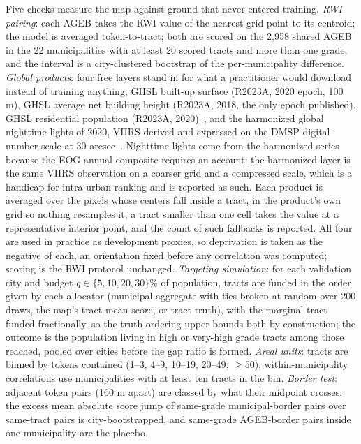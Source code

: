 \documentclass[11pt]{article}
\begin{document}
Five checks measure the map against ground that never entered training. \emph{RWI
pairing}: each AGEB takes the RWI value of the nearest grid point to its centroid; the
model is averaged token-to-tract; both are scored on the 2{,}958 shared AGEB in the 22
municipalities with at least 20 scored tracts and more than one grade, and the interval
is a city-clustered bootstrap of the per-municipality difference. \emph{Global
products}: four free layers stand in for what a practitioner would download instead of
training anything, GHSL built-up surface (R2023A, 2020 epoch, 100 m), GHSL average net
building height (R2023A, 2018, the only epoch published), GHSL residential population
(R2023A, 2020)~\cite{ghsl2023}, and the harmonized global nighttime lights of 2020,
VIIRS-derived and expressed on the DMSP digital-number scale at 30
arcsec~\cite{li2020}. Nighttime lights come from the harmonized series because the EOG
annual composite requires an account; the harmonized layer is the same VIIRS
observation on a coarser grid and a compressed scale, which is a handicap for
intra-urban ranking and is reported as such. Each product is averaged over the pixels
whose centers fall inside a tract, in the product's own grid so nothing resamples it; a
tract smaller than one cell takes the value at a representative interior point, and the
count of such fallbacks is reported. All four are used in practice as development
proxies, so deprivation is taken as the negative of each, an orientation fixed before
any correlation was computed; scoring is the RWI protocol unchanged.
\emph{Targeting simulation}: for each validation city and budget $q \in \{5, 10, 20,
30\}\%$ of population, tracts are funded in the order given by each allocator (municipal
aggregate with ties broken at random over 200 draws, the map's tract-mean score, or
tract truth), with the marginal tract funded fractionally, so the truth ordering
upper-bounds both by construction; the outcome is the population living in high or
very-high grade tracts among those reached, pooled over cities before the gap ratio is
formed. \emph{Areal units}: tracts are binned by tokens contained (1--3, 4--9, 10--19,
20--49, $\geq$50); within-municipality correlations use municipalities with at least
ten tracts in the bin. \emph{Border test}: adjacent token pairs (160 m apart) are
classed by what their midpoint crosses; the excess mean absolute score jump of
same-grade municipal-border pairs over same-tract pairs is city-bootstrapped, and
same-grade AGEB-border pairs inside one municipality are the placebo.
\end{document}
